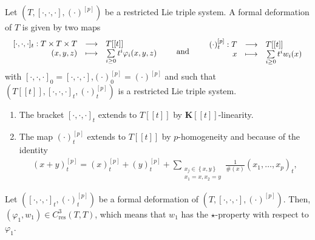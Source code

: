 \documentclass[11pt, twoside]{article}
\begin{document}
\begin{defi}
    Let $(T,[\cdot,\cdot,\cdot],(\cdot)^{[p]}) $ be a restricted Lie triple system. A formal deformation of $T$ is given by two maps \[
\begin{array}{c@{\qquad\text{and}\qquad}c}
\begin{array}{rcl}
[\cdot,\cdot,\cdot]_t : T\times T\times T & \longrightarrow & T[[t]] \\
(x,y,z) & \longmapsto & \sum\limits_{i\geq 0}t^i\varphi_i(x,y,z)
\end{array}
&
\begin{array}{rcl}
(\cdot)^{[p]}_t : T & \longrightarrow & T[[t]] \\
x & \longmapsto & \sum\limits_{i\geq 0}t^iw_i(x)
\end{array}
\end{array}
\] with $[\cdot,\cdot,\cdot]_0=[\cdot,\cdot,\cdot] $,$(\cdot)^{[p]}_0= (\cdot)^{[p]} $ and such that $(T[[t]],[\cdot,\cdot,\cdot]_t,(\cdot)^{[p]}_t) $ is a restricted Lie triple system.
\end{defi}

\begin{rmq}
    \begin{enumerate}
        \item The bracket $[\cdot,\cdot,\cdot]_t $ extends to $T[[t]] $ by $\mathbf{K}[[t]] $-linearity.
        \item The map  $(\cdot)^{[p]}_t $ extends to $T[[t]] $ by $p$-homogeneity and because of the identity \begin{align*}
        (x+y)^{[p]}_t= (x)^{[p]}_t+ (y)^{[p]}_t+ \sum_{\substack{x_j\in \left\{x,y \right\}\\x_1=x,x_2=y}}\frac{1}{\#(x)}(x_1,\ldots,x_p)_t,  
    \end{align*}
    \end{enumerate}
\end{rmq}

\begin{prop}
    Let $([\cdot,\cdot,\cdot]_t,(\cdot)^{[p]}_t) $ be a formal deformation of $(T,[\cdot,\cdot,\cdot],(\cdot)^{[p]}) $. Then, $(\varphi_1,w_1)\in C^3_\mathrm{res}(T,T) $, which means that $w_1 $ has the $\star$-property with respect to $\varphi_1 $.
\end{prop}
\end{document}
